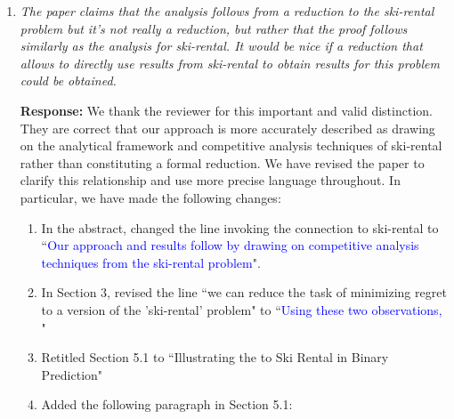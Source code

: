 \documentclass[11pt]{article}
\newcommand{\rev}{\textcolor{blue}}
\begin{document}
\begin{enumerate}
    \item \emph{The paper claims that the analysis follows from a reduction to the ski-rental problem but it’s not really a reduction, but rather that the proof follows similarly as the analysis for ski-rental. It would be nice if a reduction that allows to directly use results from ski-rental to obtain results for this problem could be obtained.}

    {\bf Response:} We thank the reviewer for this important and valid distinction. They are correct that our approach is more accurately described as drawing on the analytical framework and competitive analysis techniques of ski-rental rather than constituting a formal reduction. We have revised the paper to clarify this relationship and use more precise language throughout. In particular, we have made the following changes:
    \begin{enumerate}
        \item In the abstract, changed the line invoking the connection to ski-rental to ``\rev{Our approach and results follow by drawing on competitive analysis techniques from the ski-rental problem}".

        \item In Section 3, revised the line ``we can reduce the task of minimizing regret to a version of the 'ski-rental' problem" to ``\rev{Using these two observations, }"

        \item  Retitled Section 5.1 to ``Illustrating the  to Ski Rental in Binary Prediction"

        \item Added the following paragraph in Section 5.1: 
        

\end{enumerate}
\end{enumerate}
\end{document}
